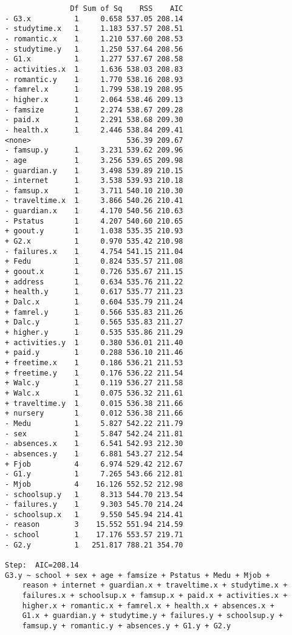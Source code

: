 \documentclass[11pt]{article}
\begin{document}
\begin{enumerate}
\begin{verbatim}
               Df Sum of Sq    RSS    AIC
- G3.x          1     0.658 537.05 208.14
- studytime.x   1     1.183 537.57 208.51
- romantic.x    1     1.210 537.60 208.53
- studytime.y   1     1.250 537.64 208.56
- G1.x          1     1.277 537.67 208.58
- activities.x  1     1.636 538.03 208.83
- romantic.y    1     1.770 538.16 208.93
- famrel.x      1     1.799 538.19 208.95
- higher.x      1     2.064 538.46 209.13
- famsize       1     2.274 538.67 209.28
- paid.x        1     2.291 538.68 209.30
- health.x      1     2.446 538.84 209.41
<none>                      536.39 209.67
- famsup.y      1     3.231 539.62 209.96
- age           1     3.256 539.65 209.98
- guardian.y    1     3.498 539.89 210.15
- internet      1     3.538 539.93 210.18
- famsup.x      1     3.711 540.10 210.30
- traveltime.x  1     3.866 540.26 210.41
- guardian.x    1     4.170 540.56 210.63
- Pstatus       1     4.207 540.60 210.65
+ goout.y       1     1.038 535.35 210.93
+ G2.x          1     0.970 535.42 210.98
- failures.x    1     4.754 541.15 211.04
+ Fedu          1     0.824 535.57 211.08
+ goout.x       1     0.726 535.67 211.15
+ address       1     0.634 535.76 211.22
+ health.y      1     0.617 535.77 211.23
+ Dalc.x        1     0.604 535.79 211.24
+ famrel.y      1     0.566 535.83 211.26
+ Dalc.y        1     0.565 535.83 211.27
+ higher.y      1     0.535 535.86 211.29
+ activities.y  1     0.380 536.01 211.40
+ paid.y        1     0.288 536.10 211.46
+ freetime.x    1     0.186 536.21 211.53
+ freetime.y    1     0.176 536.22 211.54
+ Walc.y        1     0.119 536.27 211.58
+ Walc.x        1     0.075 536.32 211.61
+ traveltime.y  1     0.015 536.38 211.66
+ nursery       1     0.012 536.38 211.66
- Medu          1     5.827 542.22 211.79
- sex           1     5.847 542.24 211.81
- absences.x    1     6.541 542.93 212.30
- absences.y    1     6.881 543.27 212.54
+ Fjob          4     6.974 529.42 212.67
- G1.y          1     7.265 543.66 212.81
- Mjob          4    16.126 552.52 212.98
- schoolsup.y   1     8.313 544.70 213.54
- failures.y    1     9.303 545.70 214.24
- schoolsup.x   1     9.550 545.94 214.41
- reason        3    15.552 551.94 214.59
- school        1    17.176 553.57 219.71
- G2.y          1   251.817 788.21 354.70

Step:  AIC=208.14
G3.y ~ school + sex + age + famsize + Pstatus + Medu + Mjob + 
    reason + internet + guardian.x + traveltime.x + studytime.x + 
    failures.x + schoolsup.x + famsup.x + paid.x + activities.x + 
    higher.x + romantic.x + famrel.x + health.x + absences.x + 
    G1.x + guardian.y + studytime.y + failures.y + schoolsup.y + 
    famsup.y + romantic.y + absences.y + G1.y + G2.y


\end{verbatim}
\end{enumerate}
\end{document}
